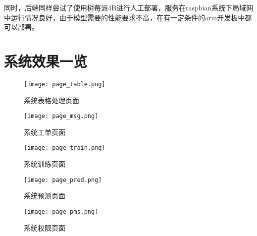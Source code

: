 同时，后端同样尝试了使用树莓派4B进行人工部署，服务在raspbian系统下局域网中运行情况良好，由于模型需要的性能要求不高，在有一定条件的arm开发板中都可以部署。

\section{系统效果一览}

\begin{figure}[!htbp]
    \centering
    \texttt{[image: page\_table.png]}
    \caption{系统表格处理页面} \label{fig:page_table}
\end{figure}

\begin{figure}[!htbp]
    \centering
    \texttt{[image: page\_msg.png]}
    \caption{系统工单页面} \label{fig:page_msg}
\end{figure}

\begin{figure}[!htbp]
    \centering
    \texttt{[image: page\_train.png]}
    \caption{系统训练页面} \label{fig:page_train}
\end{figure}

\begin{figure}[!htbp]
    \centering
    \texttt{[image: page\_pred.png]}
    \caption{系统预测页面} \label{fig:page_pred}
\end{figure}

\begin{figure}[!htbp]
    \centering
    \texttt{[image: page\_pms.png]}
    \caption{系统权限页面} \label{fig:page_pms}
\end{figure}